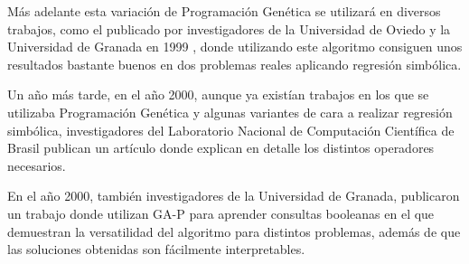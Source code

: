 Más adelante esta variación de Programación Genética se utilizará en diversos trabajos, como el publicado por investigadores de la Universidad de Oviedo y la Universidad de Granada en 1999 \cite{GAPredElectrica}, donde utilizando este algoritmo consiguen unos resultados bastante buenos en dos problemas reales aplicando regresión simbólica.

Un año más tarde, en el año 2000, aunque ya existían trabajos en los que se utilizaba Programación Genética y algunas variantes de cara a realizar regresión simbólica, investigadores del Laboratorio Nacional de Computación Científica de Brasil publican un artículo \cite{PGregresionSimbolica} donde explican en detalle los distintos operadores necesarios.

En el año 2000, también investigadores de la Universidad de Granada, publicaron un trabajo donde utilizan GA-P para aprender consultas booleanas \cite{GAPFormulasBooleanas} en el que demuestran la versatilidad del algoritmo para distintos problemas, además de que las soluciones obtenidas son fácilmente interpretables.




\newpage
